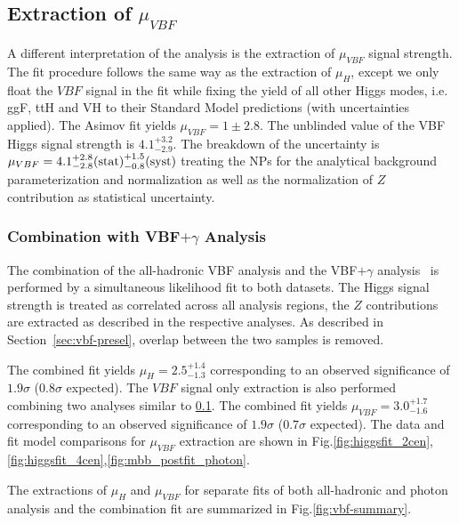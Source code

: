 \subsection{Extraction of $\mu_{VBF}$}
\label{sec:vbf-higgsunblindvbf}
A different interpretation of the analysis is the extraction of $\mu_{VBF}$ signal strength.
The fit procedure follows the same way as the extraction of $\mu_{H}$, except we only float
the $VBF$ signal in the fit while fixing the yield of all other Higgs modes, i.e. ggF,
ttH and VH to their Standard Model predictions (with uncertainties applied).
The Asimov fit yields $\mu_{VBF}=1\pm 2.8$. The unblinded value of the VBF Higgs signal
strength is $4.1^{+3.2}_{-2.9}$. The breakdown of the uncertainty
is $\mu_{VBF}=4.1^{+2.8}_{-2.8}\textnormal{(stat)}^{+1.5}_{-0.8}\textnormal{(syst)}$ treating
the NPs for the analytical background parameterization and normalization as well as
the normalization of $Z$ contribution as statistical uncertainty.


\subsubsection{Combination with VBF$+\gamma$ Analysis}
\label{sec:vbf-higgscomb}

The combination of the all-hadronic VBF analysis and the
VBF$+\gamma$ analysis~\cite{vbfplusgammaint} is performed
by a simultaneous likelihood fit to both datasets. The Higgs signal strength is
treated as correlated across all analysis regions,
the $Z$ contributions are extracted as described in the respective analyses.
As described in Section~\ref{sec:vbf-presel}, overlap between the two samples is removed.

The combined fit yields $\mu_H = 2.5^{+1.4}_{-1.3}$ corresponding to an observed significance
of $1.9\sigma$ ($0.8\sigma$ expected). The $VBF$ signal only extraction is also performed combining two analyses similar to \ref{sec:vbf-higgsunblindvbf}. The combined fit yields $\mu_{VBF} =3.0^{+1.7}_{-1.6}$ corresponding to an observed significance of $1.9\sigma$ ($0.7\sigma$ expected). The data and fit model comparisons for $\mu_{VBF}$ extraction are shown in Fig.\ref{fig:higgsfit_2cen},\ref{fig:higgsfit_4cen},\ref{fig:mbb_postfit_photon}.

The extractions of $\mu_{H}$ and $\mu_{VBF}$ for separate fits of both all-hadronic and photon analysis and the combination fit are summarized in Fig.\ref{fig:vbf-summary}.



